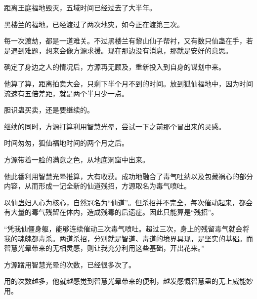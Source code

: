 \begin{this_body}
距离王庭福地毁灭，五域时间已经过去了大半年。

黑楼兰的福地，已经渡过了两次地灾，如今正在渡第三次。

每一次渡劫，都是一道难关。不过黑楼兰有黎山仙子帮衬，又有数只仙蛊在手，若是遇到难题，想来会像方源求援。现在那边没有消息，那就是安好的意思。

确定了身边之人的情况后，方源再无顾及，重新投入到自身的谋划中来。

他算了算，距离拍卖大会，只剩下半个月不到的时间。放到狐仙福地中，因为时间流速有五倍差距，就是两个半月少一点。

胆识蛊买卖，还是要继续的。

继续的同时，方源打算利用智慧光晕，尝试一下之前那个冒出来的灵感。

时间匆匆，狐仙福地时间的两个月之后。

方源带着一脸的满意之色，从地底洞窟中出来。

他此番利用智慧光晕推算，大有收获。成功地融合了毒气吐纳以及包藏祸心的部分内容，从而形成一记全新的仙道残招，方源取名为毒气喷吐。

以仙蛊妇人心为核心，自然冠名为“仙道”。但杀招并不完全，每次催动起来，都会有大量的毒气残留在体内，造成残毒的后遗症。因此只能算是“残招”。

“凭我仙僵身躯，能够连续催动三次毒气喷吐。超过三次，身上的残留毒气就会将我的魂魄都毒杀。两道杀招，分别就是智道、毒道的境界具现，是坚实的基础。而智慧光晕带来的无相灵感，则让我充分利用这些基础，开出花来。”

方源蹭用智慧光晕的次数，已经很多次了。

用的次数越多，他就越感觉到智慧光晕带来的便利，越发感慨智慧蛊的无上威能妙用。

\end{this_body}

